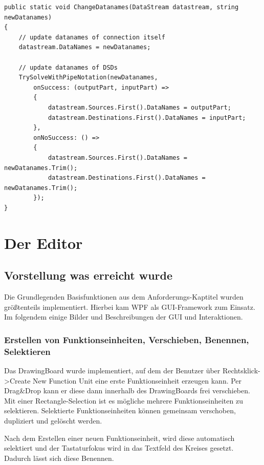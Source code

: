 \begin{enumerate}
	\begin{lstlisting}[caption=ChangeDatanames Methode]
public static void ChangeDatanames(DataStream datastream, string newDatanames)
{
	// update datanames of connection itself
	datastream.DataNames = newDatanames;
	
	// update datanames of DSDs
	TrySolveWithPipeNotation(newDatanames,
		onSuccess: (outputPart, inputPart) =>
		{
			datastream.Sources.First().DataNames = outputPart;
			datastream.Destinations.First().DataNames = inputPart;
		},
		onNoSuccess: () =>
		{
			datastream.Sources.First().DataNames = newDatanames.Trim();
			datastream.Destinations.First().DataNames = newDatanames.Trim();
		});
}
\end{lstlisting}
	
\end{enumerate}



\section{Der Editor}

\subsection{Vorstellung was erreicht wurde}

Die Grundlegenden Basisfunktionen aus dem Anforderungs-Kaptitel wurden größtenteils implementiert. Hierbei kam WPF als GUI-Framework zum Einsatz.
Im folgendem einige Bilder und Beschreibungen der GUI und Interaktionen.


\subsubsection{Erstellen von Funktionseinheiten, Verschieben, Benennen, Selektieren}

	Das DrawingBoard wurde implementiert, auf dem der Benutzer über 
	Rechtsklick->Create New Function Unit eine erste Funktionseinheit erzeugen
	kann. Per Drag\&Drop kann er diese dann innerhalb des DrawingBoards frei
	verschieben. Mit einer Rectangle-Selection ist es mögliche mehrere
	Funktionseinheiten zu selektieren. Selektierte Funktionseinheiten können
	gemeinsam verschoben, dupliziert und gelöscht werden.
	
	Nach dem Erstellen einer neuen Funktionseinheit, wird diese automatisch
	selektiert und der Tastaturfokus wird in das Textfeld des Kreises gesetzt.
	Dadurch lässt sich diese Benennen.
	
